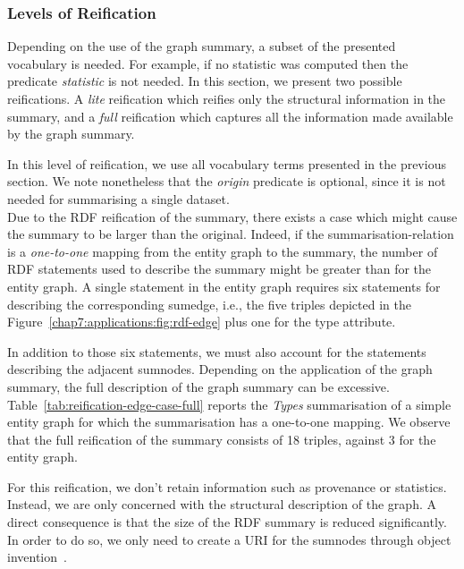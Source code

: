 \subsubsection{Levels of Reification}

Depending on the use of the graph summary, a subset of the presented vocabulary is needed. For example, if no statistic was computed then the predicate \emph{statistic} is not needed. In this section, we present two possible reifications. A \emph{lite} reification which reifies only the structural information in the summary, and a \emph{full} reification which captures all the information made available by the graph summary.


In this level of reification, we use all vocabulary terms presented in the previous section. We note nonetheless that the \emph{origin} predicate is optional, since it is not needed for summarising a single dataset.\\

Due to the RDF reification of the summary, there exists a case which might cause the summary to be larger than the original. Indeed, if the \gls{summarisation-relation} is a \emph{one-to-one} mapping from the entity graph to the summary, the number of RDF statements used to describe the summary might be greater than for the entity graph. A single statement in the entity graph requires six statements for describing the corresponding sumedge, i.e., the five triples depicted in the Figure~\ref{chap7:applications:fig:rdf-edge} plus one for the type attribute.

In addition to those six statements, we must also account for the statements describing the adjacent sumnodes. Depending on the application of the graph summary, the full description of the graph summary can be excessive.\\

Table~\ref{tab:reification-edge-case-full} reports the \emph{Types} summarisation of a simple entity graph for which the summarisation has a one-to-one mapping. We observe that the full reification of the summary consists of 18 triples, against 3 for the entity graph.


For this reification, we don't retain information such as provenance or statistics. Instead, we are only concerned with the structural description of the graph. A direct consequence is that the size of the RDF summary is reduced significantly. In order to do so, we only need to create a URI for the sumnodes through object invention~\cite{hull:1989:usi}.

